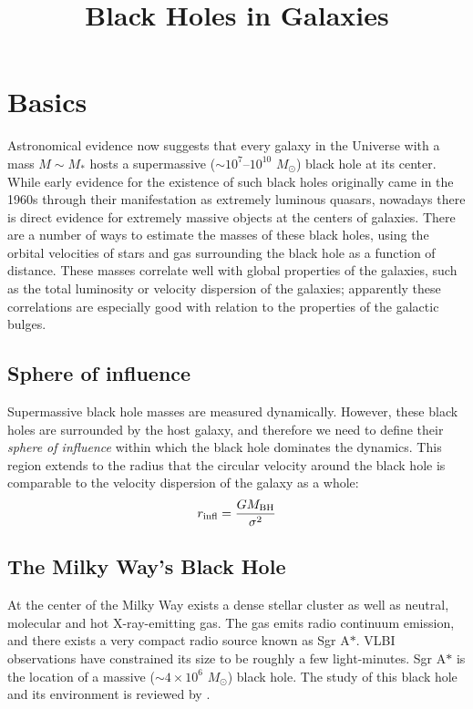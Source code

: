 \title{Black Holes in Galaxies}

\section{Basics}

Astronomical evidence now suggests that every galaxy in the Universe
with a mass $M\sim M_\ast$ hosts a supermassive ($\sim
10^7$--$10^{10}$ $M_\odot$) black hole at its center. While early
evidence for the existence of such black holes originally came in the
1960s through their manifestation as extremely luminous quasars,
nowadays there is direct evidence for extremely massive objects at the
centers of galaxies.  There are a number of ways to estimate the
masses of these black holes, using the orbital velocities of stars and
gas surrounding the black hole as a function of distance. These masses
correlate well with global properties of the galaxies, such as the
total luminosity or velocity dispersion of the galaxies; apparently
these correlations are especially good with relation to the properties
of the galactic bulges.

\subsection{Sphere of influence}

Supermassive black hole masses are measured dynamically. However,
these black holes are surrounded by the host galaxy, and therefore we
need to define their {\it sphere of influence} within which the black
hole dominates the dynamics. This region extends to the radius that
the circular velocity around the black hole is comparable to the
velocity dispersion of the galaxy as a whole:
\begin{equation}
r_{\rm infl} = \frac{GM_{\rm BH}}{\sigma^2}
\end{equation}

\subsection{The Milky Way's Black Hole}

At the center of the Milky Way exists a dense stellar cluster as well
as neutral, molecular and hot X-ray-emitting gas. The gas emits radio
continuum emission, and there exists a very compact radio source known
as Sgr A$\ast$. VLBI observations have constrained its size to be
roughly a few light-minutes.  Sgr A$\ast$ is the location of a massive
($\sim 4\times 10^6$ $M_\odot$) black hole.  The study of this black
hole and its environment is reviewed by \citet{genzel10a}.

